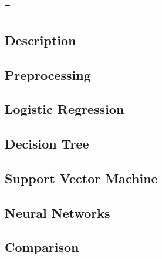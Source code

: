 \section{-}
\label{db:sec:ds3}
\subsection{Description}

\subsection{Preprocessing}

\subsection{Logistic Regression}

\subsection{Decision Tree}

\subsection{Support Vector Machine}

\subsection{Neural Networks}

\subsection{Comparison}
